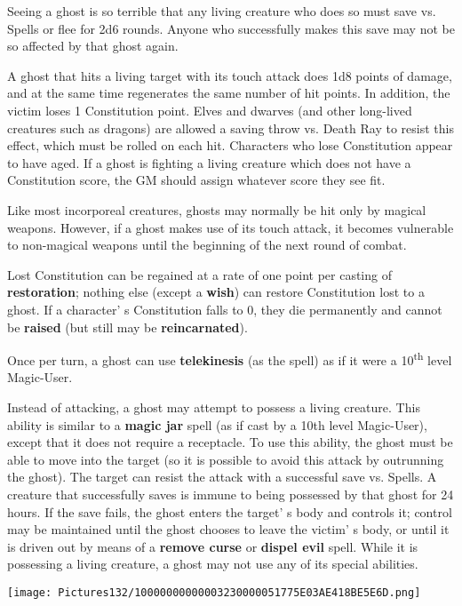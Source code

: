 \documentclass[a4paper,twoside,openany,10pt]{book}
\begin{document}
\begin{multicols}{2}
Seeing a ghost is so terrible that any living creature who does so must save vs. Spells or flee for 2d6 rounds. Anyone who successfully makes this save may not be so affected by that ghost again.

A ghost that hits a living target with its touch attack does 1d8 points of damage, and at the same time regenerates the same number of hit points. In addition, the victim loses 1 Constitution point. Elves and dwarves (and other long-lived creatures such as dragons) are allowed a saving throw vs. Death Ray to resist this effect, which must be rolled on each hit. Characters who lose Constitution appear to have aged. If a ghost is fighting a living creature which does not have a Constitution score, the GM should assign whatever score they see fit. 

Like most incorporeal creatures, ghosts may normally be hit only by magical weapons. However, if a ghost makes use of its touch attack, it becomes vulnerable to non-magical weapons until the beginning of the next round of combat.

Lost Constitution can be regained at a rate of one point per casting of \textbf{restoration}; nothing else (except a \textbf{wish}) can restore Constitution lost to a ghost. If a character' s Constitution falls to 0, they die permanently and cannot be \textbf{raised} (but still may be \textbf{reincarnated}).

Once per turn, a ghost can use \textbf{telekinesis} (as the spell) as if it were a 10\textsuperscript{th} level Magic-User.

Instead of attacking, a ghost may attempt to possess a living creature. This ability is similar to a \textbf{magic jar} spell (as if cast by a 10th level Magic-User), except that it does not require a receptacle. To use this ability, the ghost must be able to move into the target (so it is possible to avoid this attack by outrunning the ghost). The target can resist the attack with a successful save vs. Spells. A creature that successfully saves is immune to being possessed by that ghost for 24 hours. If the save fails, the ghost enters the target' s body and controls it; control may be maintained until the ghost chooses to leave the victim' s body, or until it is driven out by means of a \textbf{remove curse} or \textbf{dispel evil} spell. While it is possessing a living creature, a ghost may not use any of its special abilities.

\begin{center}
	\texttt{[image: Pictures132/10000000000003230000051775E03AE418BE5E6D.png]}
\end{center}




\end{multicols}
\end{document}
